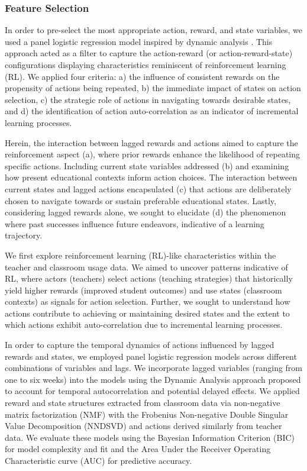 \documentclass[
  number,
  preprint,
  3p,
  onecolumn]{elsarticle}
\begin{document}
\subsubsection{Feature Selection}\label{feature-selection}

In order to pre-select the most appropriate action, reward, and state
variables, we used a panel logistic regression model inspired by dynamic
analysis \citep{lau2005}. This approach acted as a filter to capture the
action-reward (or action-reward-state) configurations displaying
characteristics reminiscent of reinforcement learning (RL). We applied
four criteria: a) the influence of consistent rewards on the propensity
of actions being repeated, b) the immediate impact of states on action
selection, c) the strategic role of actions in navigating towards
desirable states, and d) the identification of action auto-correlation
as an indicator of incremental learning processes.

Herein, the interaction between lagged rewards and actions aimed to
capture the reinforcement aspect (a), where prior rewards enhance the
likelihood of repeating specific actions. Including current state
variables addressed (b) and examining how present educational contexts
inform action choices. The interaction between current states and lagged
actions encapsulated (c) that actions are deliberately chosen to
navigate towards or sustain preferable educational states. Lastly,
considering lagged rewards alone, we sought to elucidate (d) the
phenomenon where past successes influence future endeavors, indicative
of a learning trajectory.

We first explore reinforcement learning (RL)-like characteristics within
the teacher and classroom usage data. We aimed to uncover patterns
indicative of RL, where actors (teachers) select actions (teaching
strategies) that historically yield higher rewards (improved student
outcomes) and use states (classroom contexts) as signals for action
selection. Further, we sought to understand how actions contribute to
achieving or maintaining desired states and the extent to which actions
exhibit auto-correlation due to incremental learning processes.

In order to capture the temporal dynamics of actions influenced by
lagged rewards and states, we employed panel logistic regression models
across different combinations of variables and lags. We incorporate
lagged variables (ranging from one to six weeks) into the models using
the Dynamic Analysis approach proposed to account for temporal
autocorrelation and potential delayed effects. We applied reward and
state structures extracted from classroom data via non-negative matrix
factorization (NMF) with the Frobenius Non-negative Double Singular
Value Decomposition (NNDSVD) and actions derived similarly from teacher
data. We evaluate these models using the Bayesian Information Criterion
(BIC) for model complexity and fit and the Area Under the Receiver
Operating Characteristic curve (AUC) for predictive accuracy.
\end{document}
